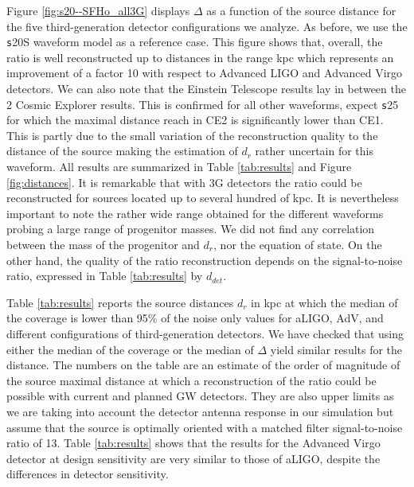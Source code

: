 Figure \ref{fig:s20--SFHo_all3G} displays $\Delta$ as a function of the source distance for the five third-generation detector configurations we analyze. As before, we use the {\texttt s20S} waveform model as a reference case.  This figure shows that,  overall, the ratio is well reconstructed up to distances in the range \unit[100--200]{kpc} which represents an improvement of a factor 10 with respect to Advanced LIGO and Advanced Virgo detectors. We can also note that the Einstein Telescope results lay in between the 2 Cosmic Explorer results. This is confirmed for all other waveforms, expect {\texttt s25}
for which the maximal distance reach in CE2 is significantly lower than CE1. This is partly due to the
small variation of the reconstruction quality to the distance of the source making the estimation of $d_r$
rather uncertain for this waveform. All results are summarized in Table \ref{tab:results} and Figure
\ref{fig:distances}. It is remarkable that with 3G detectors the ratio could be reconstructed for sources
located up to several hundred of kpc. It is nevertheless important to note the rather wide range obtained
for the different waveforms probing a large range of progenitor masses.
We did not find any correlation between the mass of the progenitor and $d_r$, nor the equation of state.
On the other hand, the quality
of the ratio reconstruction depends on the signal-to-noise ratio, expressed in Table \ref{tab:results} by
$d_{det}$.


Table \ref{tab:results} reports the source distances $d_r$ in kpc at which the median of the coverage is lower than 95\% of the noise only values for aLIGO, AdV, and different configurations of third-generation detectors. We have checked that using either the median of the coverage or the median of $\Delta$ yield similar results for the distance.
The numbers on the table are an estimate of the order of magnitude of the source maximal distance at which a
reconstruction of the ratio could be possible with current and planned GW detectors.
They are also upper limits as we are taking into account the detector antenna response in our
simulation but assume that the source is optimally oriented with a matched filter signal-to-noise ratio of 13. 
Table \ref{tab:results} shows that the results for the Advanced Virgo detector at design sensitivity are very similar to those of aLIGO, despite the differences in detector sensitivity.







